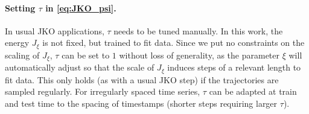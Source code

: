 
\paragraph{Setting $\tau$ in \eqref{eq:JKO_psi}.} 
In usual JKO applications, $\tau$ needs to be tuned manually. In this work, the energy $J_\xi$ is not fixed, but trained to fit data. Since we put no constraints on the scaling of $J_\xi$, $\tau$ can be set to $1$ without loss of generality, as the parameter $\xi$ will automatically adjust so that the scale of $J_\xi$ induces steps of a relevant length to fit data. This only holds (as with a usual JKO step) if the trajectories are sampled regularly. For irregularly spaced time series, $\tau$ can be adapted at train and test time to the spacing of timestamps (shorter steps requiring larger $\tau$).


\begin{table}[t]
    \caption{Evaluation of predictive performance w.r.t. the entropy-regularized Wasserstein distance $W_\varepsilon$ \eqref{eq:reg-ot} of \textsc{JKOnet} and the forward method on the embryoid body scRNA-seq data per time step (using 3 runs).}
    \label{tab:exp_jkonet_cell_pred}
    \centering
{}
\end{table}

